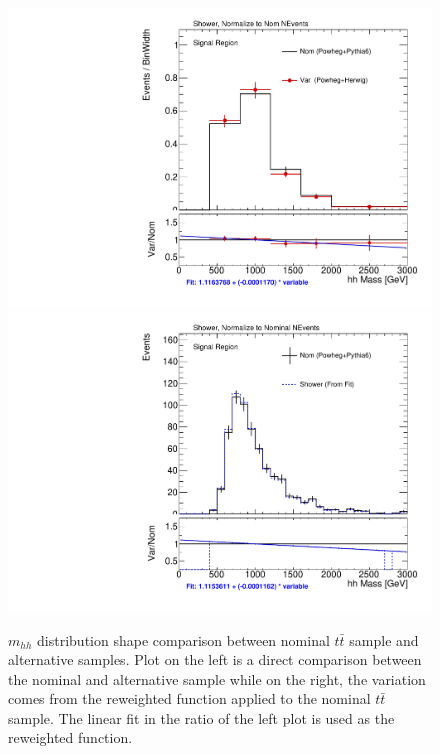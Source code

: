 \begin{figure}[!htbp]
\begin{center}
\includegraphics[scale=0.25]{./figures/boosted/systematics/ttbar_alt_hhMass_SR_Shower_rebin}
\includegraphics[scale=0.25]{./figures/boosted/systematics/ttbar_fromfit_hhMass_SR_Shower}   \\
\caption[$m_{hh}$ distribution shape comparison between nominal $t\bar{t}$ sample and alternative samples]{$m_{hh}$ distribution shape comparison between nominal $t\bar{t}$ sample and alternative samples. Plot on the left is a direct
comparison between the nominal and alternative sample while on the right, the variation comes from the reweighted function applied to
the nominal $t\bar{t}$ sample. The linear fit in the ratio of the left plot is used as the reweighted function.}
\label{fig:boosted_unc_ttbar_shape_sr}
\end{center}
\end{figure}
 
